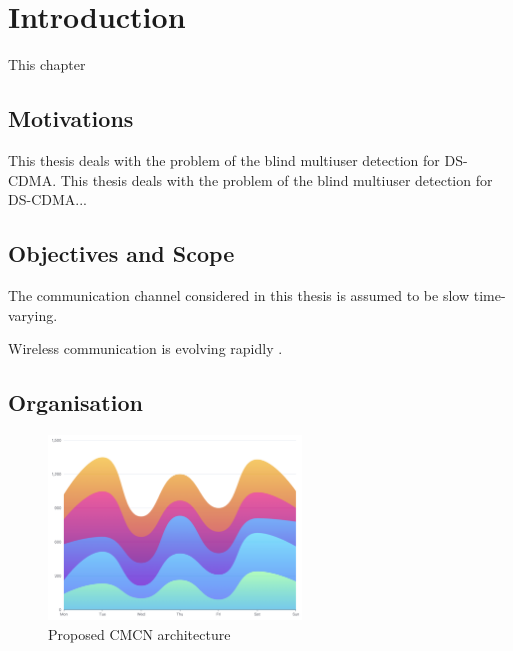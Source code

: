\chapter{Introduction}
\begingroup
\raggedright
{}
\setlength{\parskip}{0.5\baselineskip}
\titlespacing{\chapter}{0pt}{0pt}{0pt}
\titlespacing{\section}{0pt}{0pt}{0pt}

This chapter \lipsum[1]

\section{Motivations}

This thesis deals with the problem of the blind multiuser detection for DS-CDMA. This thesis deals with the problem of the blind multiuser detection for DS-CDMA...

\lipsum[1-2]

\section{Objectives and Scope}

The communication channel considered in this thesis is assumed to be slow time-varying. \lipsum[1]

Wireless communication is evolving rapidly \cite{jordan2002,padgett1995}.

\section{Organisation}

\lipsum[1-2]

\begin{figure}[h]
    \centering
    \includegraphics[width=0.6\textwidth]{assets/figures/demo.png}
    \caption{Proposed CMCN architecture}
    \label{fig:cmcn}
\end{figure}

\endgroup